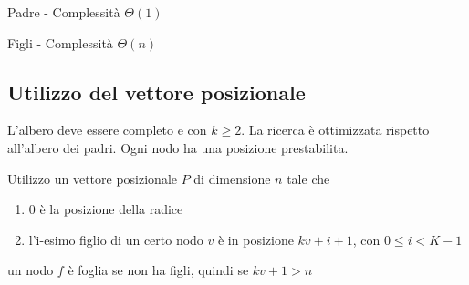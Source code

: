 {Padre - Complessità $\Theta(1)$}



{Figli - Complessità $\Theta(n)$}



\subsection{Utilizzo del vettore posizionale}

{L'albero deve essere completo e con $k \geq 2$. La ricerca è ottimizzata rispetto all'albero dei padri. Ogni nodo ha una posizione prestabilita.}

{Utilizzo un vettore posizionale $P$ di dimensione $n$ tale che }

\begin{enumerate}
\tightlist
\item
  {0 è la posizione della radice}
\item
  {l'i-esimo figlio di un certo nodo $v$ è in posizione $kv+i+1$, con $0\leq i < K-1$}
\end{enumerate}

{un nodo $f$ è foglia se non ha figli, quindi se $kv+1>n$}

